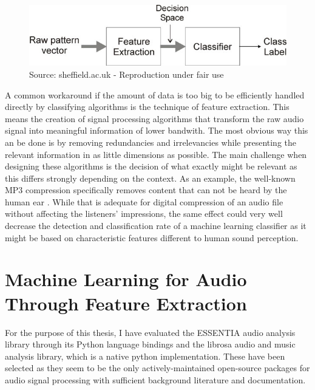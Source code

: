 \begin{figure}[h]
    \centering
	\includegraphics[width=.8\textwidth]{./images/illustrations/pipeline-fe}
    \caption{Source: sheffield.ac.uk - Reproduction under fair use}
    \label{fig:pipeline-fe}
\end{figure}


A common workaround if the amount of data is too big to be efficiently handled directly by classifying algorithms is the technique of feature extraction. This means the creation of signal processing algorithms that transform the raw audio signal into meaningful information of lower bandwith. The most obvious way this an be done is by removing redundancies and irrelevancies while presenting the relevant information in as little dimensions as possible. The main challenge when designing these algorithms is the decision of what exactly might be relevant as this differs strongly depending on the context.
As an example, the well-known MP3 compression specifically removes content that can not be heard by the human ear \cite{brandenburg1999mp3}. While that is adequate for digital compression of an audio file without affecting the listeners' impressions, the same effect could very well decrease the detection and classification rate of a machine learning classifier as it might be based on characteristic features different to human sound perception.  


\section{Machine Learning for Audio Through Feature Extraction}
\label{mlfatefe}







For the purpose of this thesis, I have evaluated the ESSENTIA audio analysis library \cite{bogdanov:Essentia:ACMMULTIMEDIA13} through its Python language bindings and the librosa audio and music analysis library\cite{BMcFee:librosa}, which is a native python implementation. 
These have been selected as they seem to be the only actively-maintained open-source packages for audio signal processing with sufficient background literature and documentation. 

